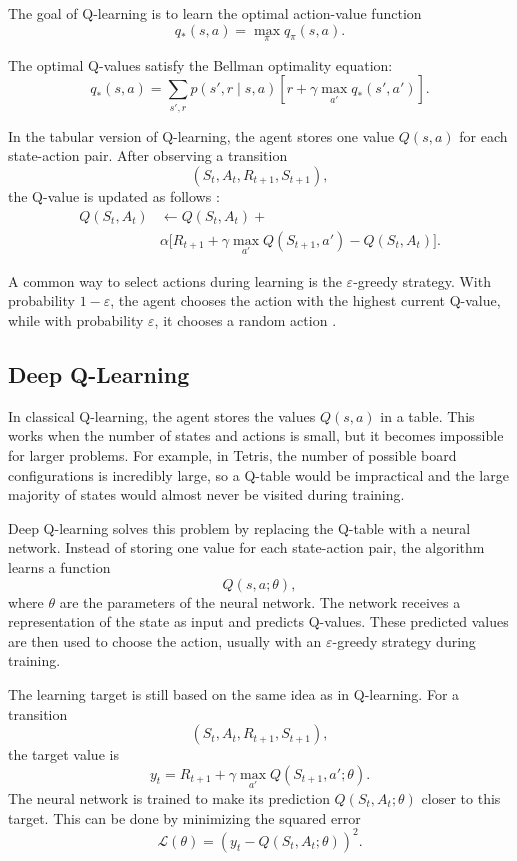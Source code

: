 \documentclass[12pt]{article}
\begin{document}
The goal of Q-learning is to learn the optimal action-value function
\[
q_*(s,a) = \max_{\pi} q_{\pi}(s,a).
\]

The optimal Q-values satisfy the Bellman optimality equation:
\[
q_*(s,a)
=
\sum_{s',r} p(s',r \mid s,a)
\left[
r + \gamma \max_{a'} q_*(s',a')
\right].
\]

In the tabular version of Q-learning, the agent stores one value $Q(s,a)$ for each state-action pair. After observing a transition
\[
(S_t,A_t,R_{t+1},S_{t+1}),
\]
the Q-value is updated as follows \autocite{sutton2018reinforcement}:
\begin{align*}
Q(S_t,A_t)
&\leftarrow
Q(S_t,A_t)
+ \\
&\alpha
\Big[
R_{t+1}
+
\gamma \max_{a'} Q(S_{t+1},a')
-
Q(S_t,A_t)
\Big].
\end{align*}

A common way to select actions during learning is the $\varepsilon$-greedy strategy. With probability $1-\varepsilon$, the agent chooses the action with the highest current Q-value, while with probability $\varepsilon$, it chooses a random action \autocite{geeksforgeeks_qlearning}.

\subsection{Deep Q-Learning}

In classical Q-learning, the agent stores the values $Q(s,a)$ in a table. This works when the number of states and actions is small, but it becomes impossible for larger problems. For example, in Tetris, the number of possible board configurations is incredibly large, so a Q-table would be impractical and the large majority of states would almost never be visited during training.

Deep Q-learning solves this problem by replacing the Q-table with a neural network. Instead of storing one value for each state-action pair, the algorithm learns a function \autocite{geeksforgeeks_deep_qlearning}
\[
Q(s,a;\theta),
\]
where $\theta$ are the parameters of the neural network. The network receives a representation of the state as input and predicts Q-values. These predicted values are then used to choose the action, usually with an $\varepsilon$-greedy strategy during training.

The learning target is still based on the same idea as in Q-learning. For a transition
\[
(S_t,A_t,R_{t+1},S_{t+1}),
\]
the target value is
\[
y_t =
R_{t+1}
+
\gamma \max_{a'} Q(S_{t+1},a';\theta).
\]
The neural network is trained to make its prediction $Q(S_t,A_t;\theta)$ closer to this target. This can be done by minimizing the squared error
\[
\mathcal{L}(\theta)
=
\left(
y_t - Q(S_t,A_t;\theta)
\right)^2.
\]
\end{document}
